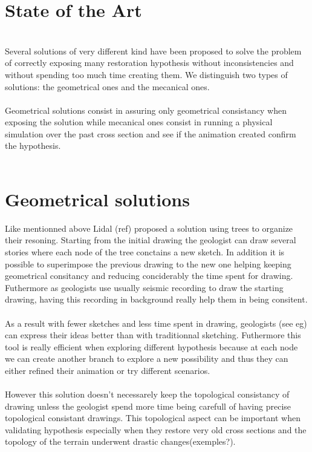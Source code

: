 \documentclass[12pt, a4paper]{memoir} %
\begin{document}
\section{State of the Art}\\

Several solutions of very different kind have been proposed to solve the problem of correctly exposing many restoration hypothesis without inconsistencies and without spending too much time creating them. We distinguish two types of solutions: the geometrical ones and the mecanical ones.\\\\

Geometrical solutions consist in assuring only geometrical consistancy when exposing the solution while mecanical ones consist in running a physical simulation over the past cross section and see if the animation created confirm the hypothesis.\\\\

\section{Geometrical solutions}

Like mentionned above Lidal (ref) proposed a solution using trees to organize their resoning. Starting from the initial drawing the geologist can draw several stories where each node of the tree conctains a new sketch. In addition it is possible to superimpose the previous drawing to the new one helping keeping geometrical consitancy and reducing conciderably the time spent for drawing. Futhermore as geologists use usually seismic recording to draw the starting drawing, having this recording in background really help them in being consitent.\\\\
 As a result with fewer sketches and less time spent in drawing, geologists (see eg) can express their ideas better than with traditionnal sketching. Futhermore this tool is really efficient when exploring different hypothesis  because at each node we can create another branch to explore a new possibility and thus they can either refined their animation or try different scenarios. \\\\

However this solution doesn't necessarely keep the topological consistancy of drawing unless the geologist spend more time being carefull of having precise topological consistant drawings. This topological aspect can be important when validating hypothesis especially when they restore very old cross sections and the topology of the terrain underwent drastic changes(exemples?).\\\\\
\end{document}
